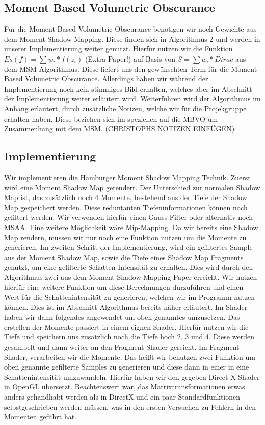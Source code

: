\documentclass[runningheaders,a4paper]{llncs}
\begin{document}
\subsection{Moment Based Volumetric Obscurance}
Für die Moment Based Volumetric Obscurance benötigen wir noch Gewichte aus dem Moment Shadow Mapping. Diese finden sich in Algorithmus 2 und werden in unserer Implementierung weiter genutzt.
Hierfür nutzen wir die Funktion $Es(f) = \sum w_i*f(z_i)$ (Extra Paper!) auf Basis von $S = \sum w_i*Dirac$ aus dem MSM Algorithmus. Diese liefert uns den gewünschten Term für die Moment Based Volumetric Obscurance. Allerdings haben wir während der Implementierung noch kein stimmiges Bild erhalten, welches aber im Abschnitt der Implementierung weiter erläutert wird. Weiterführen wird der Algorithmus im Anhang erläutert, durch zusätzliche Notizen, welche wir für die Projekgruppe erhalten haben. Diese beziehen sich im speziellen auf die MBVO um Zusammenhang mit dem MSM. (CHRISTOPHS NOTIZEN EINFÜGEN)

\subsection{Implementierung}

Wir implementieren die Hamburger Moment Shadow Mapping Technik. 
Zuerst wird eine Moment Shadow Map gerendert. Der Unterschied zur normalen Shadow Map ist, das zusätzlich noch 4 Momente, bestehend aus der Tiefe der Shadow Map gespeichert werden. Diese reduntanten Tiefeninformationen können noch gefiltert werden. Wir verwenden hierfür einen Gauss Filter oder alternativ noch MSAA. Eine weitere Möglichkeit wäre Mip-Mapping. Da wir bereits eine Shadow Map rendern, müssen wir nur noch eine Funktion nutzen um die Momente zu generieren.
Im zweiten Schritt der Implementierung, wird ein gefiltertes Sample aus der Moment Shadow Map, sowie die Tiefe eines Shadow Map Fragments genutzt, um eine gefilterte Schatten Intensität zu erhalten. Dies wird durch den Algorithmus zwei aus dem Moment Shadow Mapping Paper erreicht.\cite{msm}
Wir nutzen hierfür eine weitere Funktion um diese Berechnungen durzuführen und einen Wert für die Schattenintensität zu generieren, welchen wir im Programm nutzen können. Dies ist im Abschnitt Algorithmus bereits näher erläutert.
Im Shader haben wir dann folgendes angewendet um oben genanntes umzusetzen.
Das erstellen der Momente passiert in einem eignen Shader. Hierfür nutzen wir die Tiefe und speichern uns zusätzlich noch die Tiefe hoch 2, 3 und 4. Diese werden gesampelt und dann weiter an den Fragment Shader gereicht.
Im Fragment Shader, verarbeiten wir die Momente. Das heißt wir benutzen zwei Funktion um oben genannte gefilterte Samples zu generieren und diese dann in einer in eine Schattenintensität umzuwandeln. Hierfür haben wir den gegeben Direct X Shader in OpenGL übersetzt. Beachtenswert war, das Matrixtransformationen etwas anders gehandhabt werden als in DirectX und ein paar Standardfunktionen selbstgeschrieben werden müssen, was in den ersten Versuchen zu Fehlern in den Momenten geführt hat.
\end{document}

